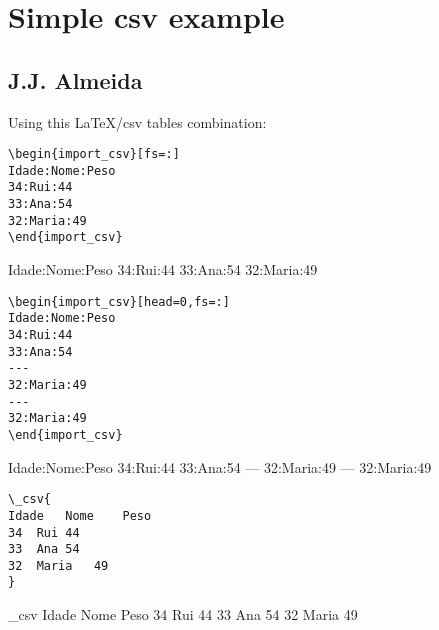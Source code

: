 \documentclass[a4paper]{article}
\begin{document}
\section*{Simple csv example}
\subsection*{J.J. Almeida}

Using this \LaTeX/csv tables combination:
\begin{verbatim}
\begin{import_csv}[fs=:]
Idade:Nome:Peso
34:Rui:44
33:Ana:54
32:Maria:49
\end{import_csv}
\end{verbatim}

\begin{import_csv}[fs=:]
Idade:Nome:Peso
34:Rui:44
33:Ana:54
32:Maria:49
\end{import_csv}

\begin{verbatim}
\begin{import_csv}[head=0,fs=:]
Idade:Nome:Peso
34:Rui:44
33:Ana:54
---
32:Maria:49
---
32:Maria:49
\end{import_csv}
\end{verbatim}
\begin{import_csv}[head=0,fs=:]
Idade:Nome:Peso
34:Rui:44
33:Ana:54
---
32:Maria:49
---
32:Maria:49
\end{import_csv}

\begin{verbatim}
\_csv{
Idade	Nome	Peso
34	Rui	44
33	Ana	54
32	Maria	49
}
\end{verbatim}

\_csv{
Idade	Nome	Peso
34	Rui	44
33	Ana	54
32	Maria	49
}
\end{document}
